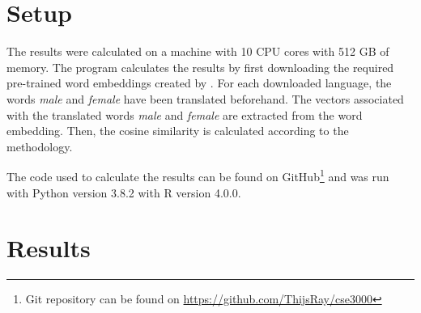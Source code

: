 \section{Setup}
The results were calculated on a machine with 10 CPU cores with 512 GB of
memory. The program calculates the results by first downloading
the required pre-trained word embeddings created by \textcite{grave2018learning}.
For each downloaded language, the words \textit{male} and \textit{female} have been
translated beforehand.
The vectors associated with the translated words \textit{male} and \textit{female} are
extracted from the word embedding. Then, the cosine similarity is calculated
according to the methodology.

The code used to calculate the results can be found on
GitHub\footnote{Git repository can be found on \url{https://github.com/ThijsRay/cse3000}}
and was run with Python version 3.8.2 with R version 4.0.0.

\section{Results}
%

